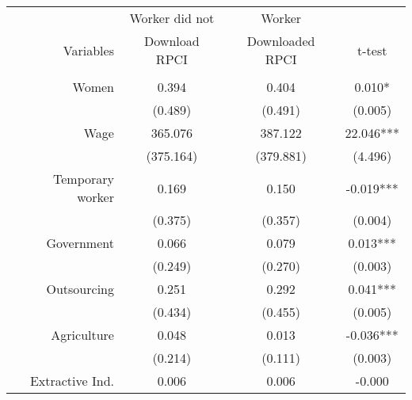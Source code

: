 \begin{tabular}{r|rrr}
\toprule
\toprule
\multicolumn{1}{p{12.085em}|}{} & \multicolumn{1}{c}{Worker did not} & \multicolumn{1}{c}{Worker} &  \\
\multicolumn{1}{p{12.085em}|}{Variables} & \multicolumn{1}{c}{Download RPCI} & \multicolumn{1}{c}{Downloaded RPCI} & \multicolumn{1}{c}{t-test} \\
\midrule
\multicolumn{1}{p{12.085em}|}{} &                 &                 &  \\
\multicolumn{1}{p{12.085em}|}{Women} & \multicolumn{1}{c}{0.394} & \multicolumn{1}{c}{0.404} & \multicolumn{1}{c}{0.010*} \\
\multicolumn{1}{p{12.085em}|}{} & \multicolumn{1}{c}{(0.489)} & \multicolumn{1}{c}{(0.491)} & \multicolumn{1}{c}{(0.005)} \\
\multicolumn{1}{p{12.085em}|}{Wage} & \multicolumn{1}{c}{365.076} & \multicolumn{1}{c}{387.122} & \multicolumn{1}{c}{22.046***} \\
                & \multicolumn{1}{c}{(375.164)} & \multicolumn{1}{c}{(379.881)} & \multicolumn{1}{c}{(4.496)} \\
\multicolumn{1}{p{12.085em}|}{Temporary worker} & \multicolumn{1}{c}{0.169} & \multicolumn{1}{c}{0.150} & \multicolumn{1}{c}{-0.019***} \\
\multicolumn{1}{p{12.085em}|}{} & \multicolumn{1}{c}{(0.375)} & \multicolumn{1}{c}{(0.357)} & \multicolumn{1}{c}{(0.004)} \\
\multicolumn{1}{p{12.085em}|}{Government} & \multicolumn{1}{c}{0.066} & \multicolumn{1}{c}{0.079} & \multicolumn{1}{c}{0.013***} \\
\multicolumn{1}{p{12.085em}|}{} & \multicolumn{1}{c}{(0.249)} & \multicolumn{1}{c}{(0.270)} & \multicolumn{1}{c}{(0.003)} \\
\multicolumn{1}{p{12.085em}|}{Outsourcing} & \multicolumn{1}{c}{0.251} & \multicolumn{1}{c}{0.292} & \multicolumn{1}{c}{0.041***} \\
                & \multicolumn{1}{c}{(0.434)} & \multicolumn{1}{c}{(0.455)} & \multicolumn{1}{c}{(0.005)} \\
\multicolumn{1}{p{12.085em}|}{Agriculture} & \multicolumn{1}{c}{0.048} & \multicolumn{1}{c}{0.013} & \multicolumn{1}{c}{-0.036***} \\
\multicolumn{1}{p{12.085em}|}{} & \multicolumn{1}{c}{(0.214)} & \multicolumn{1}{c}{(0.111)} & \multicolumn{1}{c}{(0.003)} \\
\multicolumn{1}{p{12.085em}|}{Extractive Ind.} & \multicolumn{1}{c}{0.006} & \multicolumn{1}{c}{0.006} & \multicolumn{1}{c}{-0.000} \\

\end{tabular}
